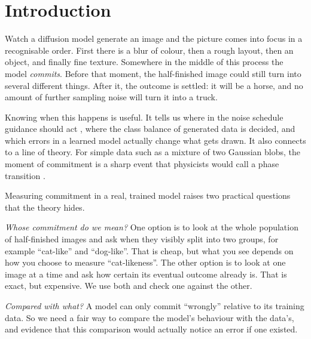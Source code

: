 \documentclass[11pt]{article}
\begin{document}
\section{Introduction}

Watch a diffusion model generate an image and the picture comes into focus in a recognisable order. First there is a blur of colour, then a rough layout, then an object, and finally fine texture. Somewhere in the middle of this process the model \emph{commits}. Before that moment, the half-finished image could still turn into several different things. After it, the outcome is settled: it will be a horse, and no amount of further sampling noise will turn it into a truck.

Knowing when this happens is useful. It tells us where in the noise schedule guidance should act \citep{kynkaanniemi2024applying}, where the class balance of generated data is decided, and which errors in a learned model actually change what gets drawn. It also connects to a line of theory. For simple data such as a mixture of two Gaussian blobs, the moment of commitment is a sharp event that physicists would call a phase transition \citep{raya2023spontaneous,biroli2023generative,biroli2024dynamical,li2024critical,sclocchi2025phase}.

Measuring commitment in a real, trained model raises two practical questions that the theory hides.

\emph{Whose commitment do we mean?} One option is to look at the whole population of half-finished images and ask when they visibly split into two groups, for example ``cat-like'' and ``dog-like''. That is cheap, but what you see depends on how you choose to measure ``cat-likeness''. The other option is to look at one image at a time and ask how certain its eventual outcome already is. That is exact, but expensive. We use both and check one against the other.

\emph{Compared with what?} A model can only commit ``wrongly'' relative to its training data. So we need a fair way to compare the model's behaviour with the data's, and evidence that this comparison would actually notice an error if one existed.
\end{document}
